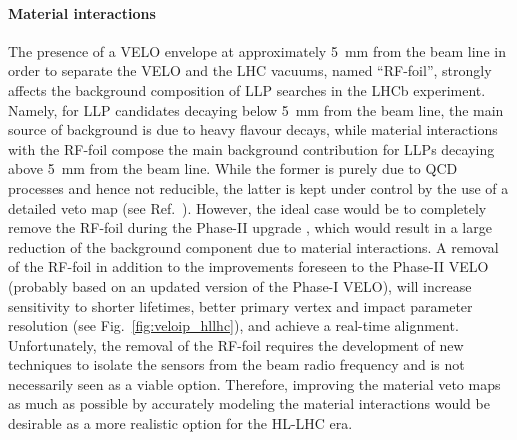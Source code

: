 \paragraph{Material interactions}

The presence of a VELO envelope at approximately 5~mm from the beam line in order to separate the VELO and the LHC vacuums, named ``RF-foil'', strongly affects the background composition of LLP searches in the LHCb experiment. Namely, for LLP candidates decaying below 5~mm from the beam line, the main source of background is due to heavy flavour decays, while material interactions with the RF-foil compose the main background contribution for LLPs decaying above 5~mm from the beam line. While the
former is purely due to QCD processes and hence not reducible, the latter is kept under control by the use of a detailed veto map (see Ref.~\cite{Aaij:2017rft}). However, the ideal case would be to completely remove the RF-foil during the Phase-II upgrade \cite{Aaij:2244311}, which would result in a large reduction of the background component due to material interactions. A removal of the RF-foil in addition to the improvements foreseen to the Phase-II VELO (probably based on an updated
version of the Phase-I VELO), will increase sensitivity to shorter lifetimes, better primary vertex and impact parameter resolution (see Fig.~\ref{fig:veloip_hllhc}), and achieve a real-time alignment. Unfortunately, the removal of the RF-foil requires the development of new techniques to isolate the sensors from the beam radio frequency and is not necessarily seen as a viable option. Therefore, improving the material veto maps as much as possible by accurately modeling the material interactions would be desirable as a more realistic option for the HL-LHC era.

